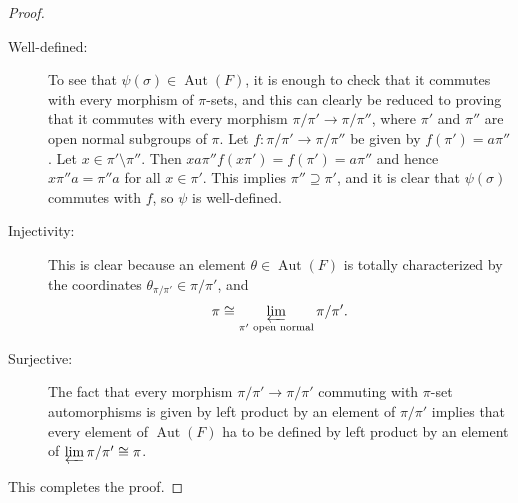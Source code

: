 \documentclass[10pt]{article}
\theoremstyle{thmstyle}
\theoremstyle{defstyle}
\newcommand{\Aut}{\operatorname{Aut}}
\begin{document}
\begin{proof}
    \begin{description}
        \item[Well-defined:] To see that $\psi(\sigma)\in\Aut(F)$, it is enough to check that it commutes with every morphism of $\pi$-sets, and this can clearly be reduced to proving that it commutes with every morphism $\pi/\pi'\to\pi/\pi''$, where $\pi'$ and $\pi''$ are open normal subgroups of $\pi$. Let $f: \pi/\pi'\to\pi/\pi''$ be given by $f(\pi') = a\pi''$. Let $x\in\pi'\setminus\pi''$. Then $xa\pi'' f(x\pi') = f(\pi') = a\pi''$ and hence $x\pi'' a = \pi''a$ for all $x\in\pi'$. This implies $\pi''\supseteq\pi'$, and it is clear that $\psi(\sigma)$ commutes with $f$, so $\psi$ is well-defined. 
        
        \item[Injectivity:] This is clear because an element $\theta\in\Aut(F)$ is totally characterized by the coordinates $\theta_{\pi/\pi'}\in\pi/\pi'$, and 
        \begin{equation*}
            \pi\cong\varprojlim_{\pi'\text{ open normal}}\pi/\pi'.
        \end{equation*}

        \item[Surjective:] The fact that every morphism $\pi/\pi'\to\pi/\pi'$ commuting with $\pi$-set automorphisms is given by left product by an element of $\pi/\pi'$ implies that every element of $\Aut(F)$ ha to be defined by left product by an element of $\varprojlim\pi/\pi'\cong\pi$. 
    \end{description}
    This completes the proof.
\end{proof}
\end{document}
